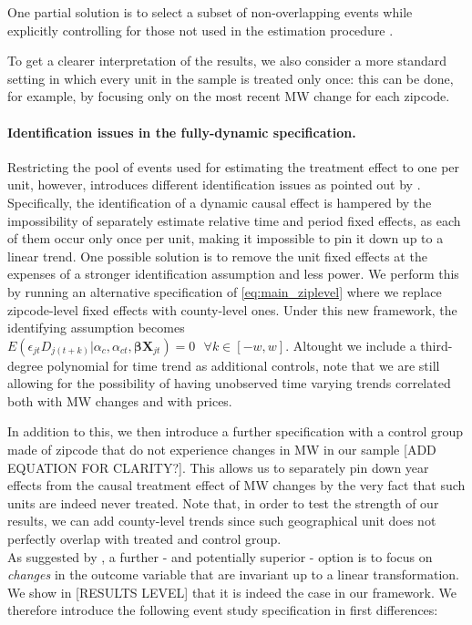 One partial solution is to select a subset of non-overlapping events while explicitly controlling for those not used in the estimation procedure \parencite{dube2016minimum}. 

To get a clearer interpretation of the results, we also consider a more standard setting in which every unit in the sample is treated only once: this can be done, for example, by focusing only on the most recent MW change for each zipcode.   


\paragraph{Identification issues in the fully-dynamic specification.} Restricting the pool of events used for estimating the treatment effect to one per unit, however, introduces different identification issues as pointed out by \textcite{borusyak2017revisiting}. Specifically, the identification of a dynamic causal effect is hampered by the impossibility of separately estimate relative time and period fixed effects, as each of them occur only once per unit, making it impossible to pin it down up to a linear trend. One possible solution is to remove the unit fixed effects at the expenses of a stronger identification assumption and less power. We perform this by running an alternative specification of \autoref{eq:main_ziplevel} where we replace zipcode-level fixed effects with county-level ones. Under this new framework, the identifying assumption becomes $E \left( \epsilon_{jt} D_{j(t+k)} | \alpha_c, \alpha_{ct}, \boldsymbol{\beta} \boldsymbol{X}_{jt}\right)  = 0  \ \ \ \forall k\in[-w, w]$. Altought we include a third-degree polynomial for time trend as additional controls, note that we are still allowing for the possibility of having unobserved time varying trends correlated both with MW changes and with prices. 

In addition to this, we then introduce a further specification with a control group made of zipcode that do not experience changes in MW in our sample [ADD EQUATION FOR CLARITY?]. This allows us to separately pin down year effects from the causal treatment effect of MW changes by the very fact that such units are indeed never treated. Note that, in order to test the strength of our results, we can add county-level trends since such geographical unit does not perfectly overlap with treated and control group. \\   



As suggested by \textcite{borusyak2017revisiting}, a further - and potentially superior - option is to focus on \textit{changes} in the outcome variable that are invariant up to a linear transformation. We show in [RESULTS LEVEL] that it is indeed the case in our framework. We therefore introduce the following event study specification in first differences: 

